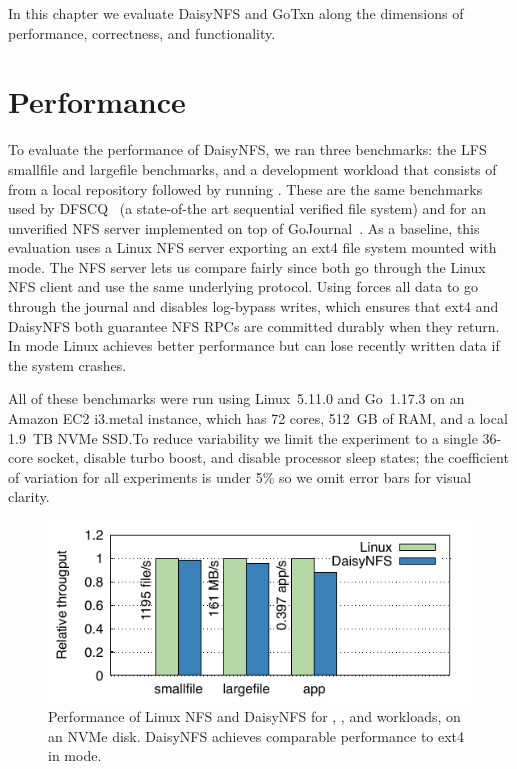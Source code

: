 In this chapter we evaluate DaisyNFS and GoTxn along the dimensions of
performance, correctness, and functionality.

\section{Performance}
\label{sec:eval:bench}

To evaluate the performance of DaisyNFS, we ran three benchmarks: the LFS smallfile
and largefile benchmarks, and a development workload that consists of  from a local repository followed by running . These are the same
benchmarks used by DFSCQ~\cite{chen:dfscq} (a state-of-the art sequential
verified file system) and for an unverified NFS server implemented on top of
GoJournal~\cite{chajed:gojournal}. As a baseline, this evaluation uses a Linux
NFS server exporting an ext4 file system mounted with  mode.
The NFS server lets us compare fairly since both go through the Linux NFS client
and use the same underlying protocol. Using  forces all data to
go through the journal and disables log-bypass writes, which ensures that
ext4 and DaisyNFS both guarantee NFS RPCs are committed durably when they return. In
 mode Linux achieves better performance but can
lose recently written data if the system crashes.

All of these benchmarks were run using Linux~5.11.0 and Go~1.17.3 on an Amazon
EC2 i3.metal instance, which has 72 cores, 512~GB of RAM, and a local 1.9~TB
NVMe SSD.\@ To reduce variability we limit the experiment to a single 36-core
socket, disable turbo boost, and disable processor sleep states; the coefficient
of variation for all experiments is under 5\% so we omit error bars for visual
clarity.



\begin{figure}
  \includegraphics{daisy-nfs/fig/bench.pdf}
  \caption[Performance for smallfile, largefile, and app benchmarks]%
  {Performance of Linux NFS and DaisyNFS for ,
    , and  workloads, on an NVMe disk.
    DaisyNFS achieves comparable performance to ext4 in  mode.}
  \label{fig:eval:bench}
\end{figure}

